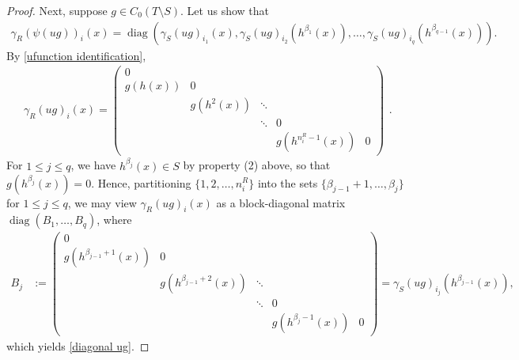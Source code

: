 \documentclass[12pt]{amsart}
\numberwithin{equation}{section}
\theoremstyle{definition}
\theoremstyle{remark}
\newcommand{\diag}{\operatorname{diag}}
\begin{document}
\begin{proof}
	Next, suppose $g\in C_{0}(T\setminus S)$. Let us show that 
	\begin{equation}
		\label{diagonal ug}
		\begin{aligned}
			\gamma_{R}(\psi(ug))_{i}(x)=\diag\left(\gamma_{S}(ug)_{i_{1}}(x),\gamma_{S}(ug)_{i_{2}}(h^{\beta_{1}}(x)),\ldots,\gamma_{S}(ug)_{i_{q}}(h^{\beta_{q-1}}(x))\right).
		\end{aligned}
	\end{equation}
	By \autoref{ufunction identification}, 
	$$
	\begin{aligned}
	\gamma_{R}(ug)_{i}(x)=
	\begin{pmatrix}
	0 & & & & \\
	g(h(x)) & 0 & & & \\
	& g(h^{2}(x)) & \ddots & &\\
	& & \ddots & 0 &\\
	& & & g(h^{n_{i}^{R}-1}(x)) & 0
	\end{pmatrix}	
	\end{aligned}.
	$$
	For $1\leq j\leq q$, we have $h^{\beta_{j}}(x)\in S$ by property (2) above, so that $g(h^{\beta_{j}}(x))=0$. Hence, partitioning $\{1,2,\ldots,n_{i}^{R}\}$ into the sets $\{\beta_{j-1}+1,\ldots,\beta_{j}\}$ for $1\leq j\leq q$, we may view $\gamma_{R}(ug)_{i}(x)$ as a block-diagonal matrix $\diag(B_{1},\ldots,B_{q})$, where
	$$
	\begin{aligned}
	B_{j}&:=\begin{pmatrix}
	0 & & & & \\
	g(h^{\beta_{j-1}+1}(x)) & 0 & & & \\
	& g(h^{\beta_{j-1}+2}(x)) & \ddots & &\\
	& & \ddots & 0 &\\
	& & & g(h^{\beta_{j}-1}(x)) & 0
	\end{pmatrix}
	=\gamma_{S}(ug)_{i_{j}}(h^{\beta_{j-1}}(x)),
	\end{aligned}
	$$
	which yields \autoref{diagonal ug}.
	

\end{proof}
\end{document}
